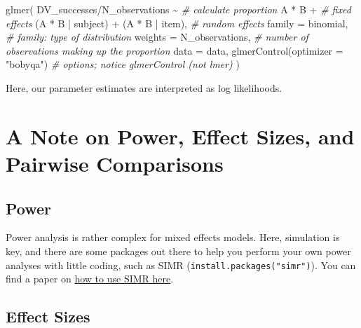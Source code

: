 \documentclass[
]{book}
\newenvironment{Shaded}{\begin{snugshade}}{\end{snugshade}}
\newcommand{\AttributeTok}[1]{\textcolor[rgb]{0.77,0.63,0.00}{#1}}
\newcommand{\CommentTok}[1]{\textcolor[rgb]{0.56,0.35,0.01}{\textit{#1}}}
\newcommand{\FunctionTok}[1]{\textcolor[rgb]{0.00,0.00,0.00}{#1}}
\newcommand{\NormalTok}[1]{#1}
\newcommand{\SpecialCharTok}[1]{\textcolor[rgb]{0.00,0.00,0.00}{#1}}
\newcommand{\StringTok}[1]{\textcolor[rgb]{0.31,0.60,0.02}{#1}}
\begin{document}
\begin{Shaded}
\begin{Highlighting}[]
\FunctionTok{glmer}\NormalTok{(}
\NormalTok{  DV\_successes}\SpecialCharTok{/}\NormalTok{N\_observations }\SpecialCharTok{\textasciitilde{}} \CommentTok{\# calculate proportion}
\NormalTok{    A }\SpecialCharTok{*}\NormalTok{ B }\SpecialCharTok{+} \CommentTok{\# fixed effects}
\NormalTok{    (A }\SpecialCharTok{*}\NormalTok{ B }\SpecialCharTok{|}\NormalTok{ subject) }\SpecialCharTok{+}\NormalTok{ (A }\SpecialCharTok{*}\NormalTok{ B }\SpecialCharTok{|}\NormalTok{ item), }\CommentTok{\# random effects }
  \AttributeTok{family =}\NormalTok{ binomial, }\CommentTok{\# family: type of distribution}
  \AttributeTok{weights =}\NormalTok{ N\_observations, }\CommentTok{\# number of observations making up the proportion}
  \AttributeTok{data =}\NormalTok{ data,}
  \FunctionTok{glmerControl}\NormalTok{(}\AttributeTok{optimizer =} \StringTok{"bobyqa"}\NormalTok{) }\CommentTok{\# options; notice glmerControl (not lmer)}
\NormalTok{  )}
\end{Highlighting}
\end{Shaded}

Here, our parameter estimates are interpreted as log likelihoods.

\hypertarget{a-note-on-power-effect-sizes-and-pairwise-comparisons}{%
\section{A Note on Power, Effect Sizes, and Pairwise Comparisons}\label{a-note-on-power-effect-sizes-and-pairwise-comparisons}}

\hypertarget{power}{%
\subsection{Power}\label{power}}

Power analysis is rather complex for mixed effects models. Here, simulation is key, and there are some packages out there to help you perform your own power analyses with little coding, such as SIMR (\texttt{install.packages("simr")}). You can find a paper on \href{https://besjournals.onlinelibrary.wiley.com/doi/abs/10.1111/2041-210X.12504}{how to use SIMR here}.

\hypertarget{effect-sizes}{%
\subsection{Effect Sizes}\label{effect-sizes}}
\end{document}
